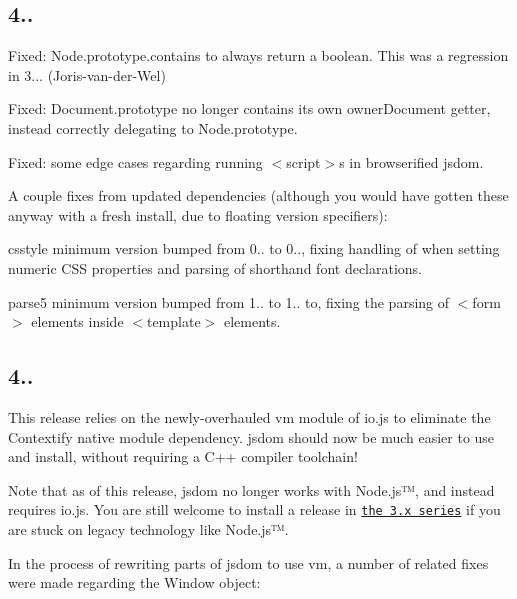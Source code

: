 \subsection*{4..}


\begin{DoxyItemize}
\item Fixed\+: {\ttfamily Node.\+prototype.\+contains} to always return a boolean. This was a regression in 3... (Joris-\/van-\/der-\/\+Wel)
\item Fixed\+: {\ttfamily Document.\+prototype} no longer contains its own {\ttfamily owner\+Document} getter, instead correctly delegating to {\ttfamily Node.\+prototype}.
\item Fixed\+: some edge cases regarding running {\ttfamily $<$script$>$}s in browserified jsdom.
\item A couple fixes from updated dependencies (although you would have gotten these anyway with a fresh install, due to floating version specifiers)\+:
\begin{DoxyItemize}
\item csstyle minimum version bumped from 0.. to 0.., fixing handling of {} when setting numeric C\+SS properties and parsing of shorthand {\ttfamily font} declarations.
\item parse5 minimum version bumped from 1.. to 1.. to, fixing the parsing of {\ttfamily $<$form$>$} elements inside {\ttfamily $<$template$>$} elements.
\end{DoxyItemize}
\end{DoxyItemize}

\subsection*{4..}

This release relies on the newly-\/overhauled {\ttfamily vm} module of io.\+js to eliminate the Contextify native module dependency. jsdom should now be much easier to use and install, without requiring a C++ compiler toolchain!

Note that as of this release, jsdom no longer works with Node.\+js™, and instead requires io.\+js. You are still welcome to install a release in \href{https://github.com/tmpvar/jsdom/tree/3.x}{\tt the 3.\+x series} if you are stuck on legacy technology like Node.\+js™.

In the process of rewriting parts of jsdom to use {\ttfamily vm}, a number of related fixes were made regarding the {\ttfamily Window} object\+:


